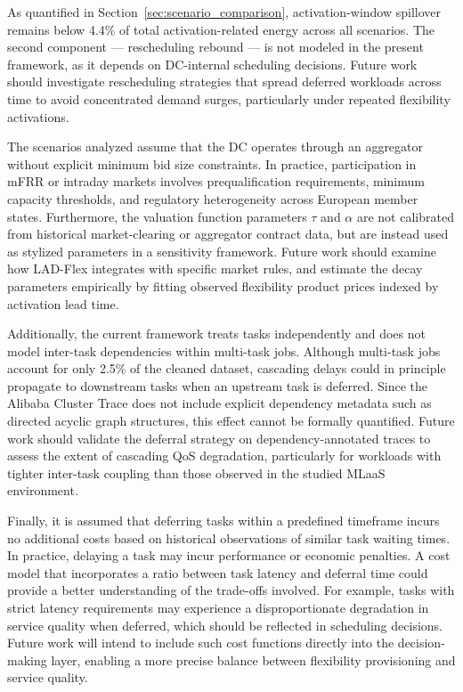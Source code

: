 \documentclass[preprint,12pt]{elsarticle}
\begin{document}
As quantified in Section~\ref{sec:scenario_comparison}, activation-window spillover remains below 4.4\% of total activation-related energy across all scenarios. The second component --- rescheduling rebound --- is not modeled in the present framework, as it depends on DC-internal scheduling decisions. Future work should investigate rescheduling strategies that spread deferred workloads across time to avoid concentrated demand surges, particularly under repeated flexibility activations.

The scenarios analyzed assume that the DC operates through an aggregator without explicit minimum bid size constraints. In practice, participation in mFRR or intraday markets involves prequalification requirements, minimum capacity thresholds, and regulatory heterogeneity across European member states. Furthermore, the valuation function parameters $\tau$ and $\alpha$ are not calibrated from historical market-clearing or aggregator contract data, but are instead used as stylized parameters in a sensitivity framework. Future work should examine how LAD-Flex integrates with specific market rules, and estimate the decay parameters empirically by fitting observed flexibility product prices indexed by activation lead time.

Additionally, the current framework treats tasks independently and does not model inter-task dependencies within multi-task jobs. Although multi-task jobs account for only 2.5\% of the cleaned dataset, cascading delays could in principle propagate to downstream tasks when an upstream task is deferred. Since the Alibaba Cluster Trace does not include explicit dependency metadata such as directed acyclic graph structures, this effect cannot be formally quantified. Future work should validate the deferral strategy on dependency-annotated traces to assess the extent of cascading QoS degradation, particularly for workloads with tighter inter-task coupling than those observed in the studied MLaaS environment.

Finally, it is assumed that deferring tasks within a predefined timeframe incurs no additional costs based on historical observations of similar task waiting times. In practice, delaying a task may incur performance or economic penalties. A cost model that incorporates a ratio between task latency and deferral time could provide a better understanding of the trade-offs involved. For example, tasks with strict latency requirements may experience a disproportionate degradation in service quality when deferred, which should be reflected in scheduling decisions. Future work will intend to include such cost functions directly into the decision-making layer, enabling a more precise balance between flexibility provisioning and service quality.
\end{document}
